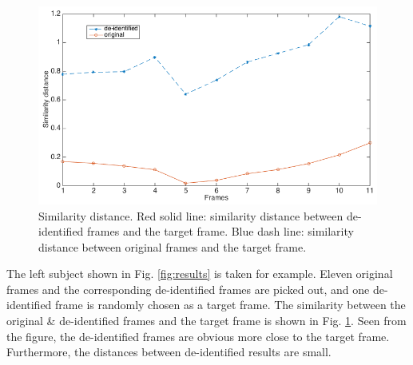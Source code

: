 	\begin{figure}[!htb]
    	\centering
    	\includegraphics[width=14cm]{figure/distance.png}
    	
		\caption{ Similarity distance. Red solid line: similarity distance between de-identified frames and the target frame.
				  Blue dash line: similarity distance between original frames and the target frame.}
		\label{fig:distance}
  	\end{figure}
The left subject shown in Fig. \ref{fig:results} is taken for example. Eleven original frames and the corresponding
de-identified frames are picked out, and one de-identified frame is randomly chosen as a target frame. The similarity 
between the original \& de-identified frames and the target frame is shown in
Fig. \ref{fig:distance}. Seen from the figure,
the de-identified frames are obvious more close to the target frame. Furthermore, the distances between
de-identified results are small. 